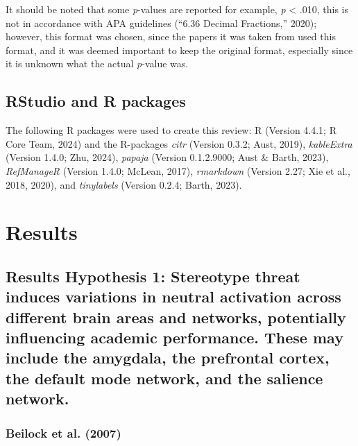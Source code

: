 \documentclass[
  stu,floatsintext]{apa7}
\begin{document}
It should be noted that some \emph{p}-values are reported for example, \emph{p} \textless{} .010, this is not in accordance with APA guidelines ({``6.36 {Decimal Fractions},''} 2020); however, this format was chosen, since the papers it was taken from used this format, and it was deemed important to keep the original format, especially since it is unknown what the actual \emph{p}-value was.

\subsection{RStudio and R packages}\label{rstudio-and-r-packages}

The following R packages were used to create this review: R (Version 4.4.1; R Core Team, 2024) and the R-packages \emph{citr} (Version 0.3.2; Aust, 2019), \emph{kableExtra} (Version 1.4.0; Zhu, 2024), \emph{papaja} (Version 0.1.2.9000; Aust \& Barth, 2023), \emph{RefManageR} (Version 1.4.0; McLean, 2017), \emph{rmarkdown} (Version 2.27; Xie et al., 2018, 2020), and \emph{tinylabels} (Version 0.2.4; Barth, 2023).

\section{Results}\label{results}

\subsection{Results Hypothesis 1: Stereotype threat induces variations in neutral activation across different brain areas and networks, potentially influencing academic performance. These may include the amygdala, the prefrontal cortex, the default mode network, and the salience network.}\label{results-hypothesis-1-stereotype-threat-induces-variations-in-neutral-activation-across-different-brain-areas-and-networks-potentially-influencing-academic-performance.-these-may-include-the-amygdala-the-prefrontal-cortex-the-default-mode-network-and-the-salience-network.}

\subsubsection{Beilock et al. (2007)}\label{beilockstereotypethreatworking2007}
\end{document}
